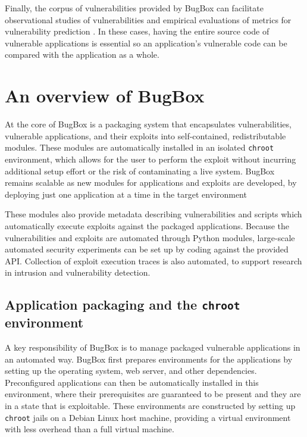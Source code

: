 \documentclass[letterpaper,twocolumn,10pt]{article}
\begin{document}
Finally, the corpus of vulnerabilities provided by BugBox can facilitate observational studies of vulnerabilities \cite{empiricalinvestigation} and empirical evaluations of metrics for vulnerability prediction \cite{evalcomplexityvul,metrisec2012surface}. In these cases, having the entire source code of vulnerable applications is essential so an application's vulnerable code can be compared with the application as a whole.

\section{An overview of BugBox}

At the core of BugBox is a packaging system that encapsulates vulnerabilities, vulnerable applications, and their exploits into self-contained, redistributable modules. These modules are automatically installed in an isolated \texttt{chroot} environment, which allows for the user to perform the exploit without incurring additional setup effort or the risk of contaminating a live system. BugBox remains scalable as new modules for applications and exploits are developed, by deploying just one application at a time in the target environment

These modules also provide metadata describing vulnerabilities and scripts which automatically execute exploits against the packaged applications. Because the vulnerabilities and exploits are automated through Python modules, large-scale automated security experiments can be set up by coding against the provided API. Collection of exploit execution traces is also automated, to support research in intrusion and vulnerability detection.

\subsection{Application packaging and the {\tt chroot} environment}

A key responsibility of BugBox is to manage packaged vulnerable applications in an automated way. BugBox first prepares environments for the applications by setting up the operating system, web server, and other dependencies. Preconfigured applications can then be automatically installed in this environment, where their prerequisites are guaranteed to be present and they are in a state that is exploitable. These environments are constructed by setting up {\tt chroot} jails on a Debian Linux host machine, providing a virtual environment with less overhead than a full virtual machine.
\end{document}
